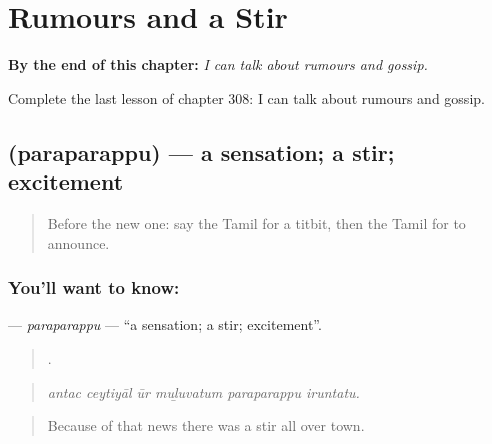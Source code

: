 
\chapter{Rumours and a Stir}
\label{ch:ta-rumours-and-a-stir}

\begin{chapteropening}
\textbf{By the end of this chapter:} \emph{I can talk about rumours and gossip.}

Complete the last lesson of chapter 308: I can talk about rumours and gossip.
\end{chapteropening}

\section[\texorpdfstring{\ta{பரபரப்பு} (paraparappu)}{பரபரப்பு (paraparappu)}]{ (paraparappu) — a sensation; a stir; excitement}

\label{lesson:TA-C308-paraparappu}



\begin{quote}
Before the new one: say the Tamil for a titbit, then the Tamil for to announce.
\end{quote}

\subsection*{You'll want to know: }
\textbf{} — \emph{paraparappu} — \textquotedblleft{}a sensation; a stir; excitement\textquotedblright{}.

\begin{quote}
     .
\end{quote}

\begin{quote}
\emph{antac ceytiyāl ūr muḻuvatum paraparappu iruntatu.}
\end{quote}

\begin{quote}
Because of that news there was a stir all over town.
\end{quote}

